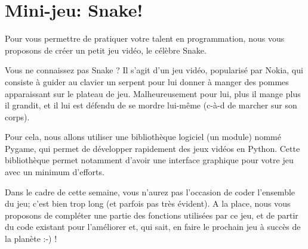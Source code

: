 \documentclass[12pt,a4paper,oneside]{report}
\begin{document}
%
%
%
%
\section{Mini-jeu: Snake!}

Pour vous permettre de pratiquer votre talent en programmation, nous vous proposons de créer un petit jeu vidéo, le célèbre Snake.

Vous ne connaissez pas Snake ? Il s'agit d'un jeu vidéo, popularisé par Nokia, qui consiste à guider au clavier un serpent pour lui donner à manger des pommes apparaissant sur le plateau de jeu. Malheureusement pour lui, plus il mange plus il grandit, et il lui est défendu de se mordre lui-même (c-à-d de marcher sur son corps).

Pour cela, nous allons utiliser une bibliothèque logiciel (un module) nommé Pygame, qui permet de développer rapidement des jeux vidéos en Python. Cette bibliothèque permet notamment d'avoir une interface graphique pour votre jeu avec un minimum d'efforts.

Dans le cadre de cette semaine, vous n'aurez pas l'occasion de coder l'ensemble du jeu; c'est bien trop long (et parfois pas très évident). A la place, nous vous proposons de compléter une partie des fonctions utilisées par ce jeu, et de partir du code existant pour l'améliorer et, qui sait, en faire le prochain jeu à succès de la planète :-) !
\end{document}
